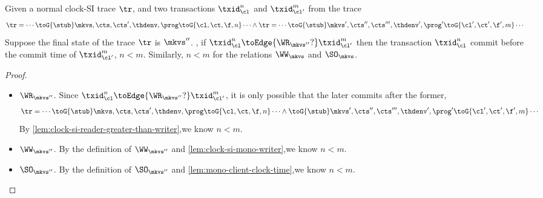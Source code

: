 \begin{lemma}
    \label{lem:clock-si-wr-ww-so}
    Given a normal clock-SI trace \( \tr \), and two transactions \( \txid_\cl^n \) and \( \txid_{\cl'}^m \) from the trace
    \[
        \begin{array}{@{}l@{}}
            \tr = \cdots \toG{\stub} \mkvs,\cts,\cts',\thdenv, \prog \toG{\cl,\ct,\f,n} \cdots \land 
            \tr = \cdots \toG{\stub} \mkvs',\cts'',\cts''',\thdenv', \prog' \toG{\cl',\ct',\f',m} \cdots
        \end{array}
    \]
    Suppose the final state of the trace \( \tr \) is \( \mkvs'' \).
    , if \( \txid_\cl^n \toEdge{\WR_{\mkvs''}?} \txid_{\cl'}^m \) then the transaction \( \txid_{\cl}^n \) commit before the commit time of \( \txid_{\cl'}^m \), \ie \( n < m \).
    Similarly, \( n <  m \) for the relations \( \WW_\mkvs \) and \( \SO_\mkvs \).
\end{lemma}
\begin{proof}
    \begin{itemize}
        \item \( \WR_{\mkvs''} \).
            Since  \( \txid_\cl^n \toEdge{\WR_{\mkvs''}?} \txid_{\cl'}^m \),
            it is only possible that the later commits after the former,
            \[
                \begin{array}{@{}l@{}}
                    \tr = \cdots \toG{\stub} \mkvs,\cts,\cts',\thdenv, \prog \toG{\cl,\ct,\f,n} \cdots \land
                    \toG{\stub} \mkvs',\cts'',\cts''',\thdenv', \prog' \toG{\cl',\ct',\f',m} \cdots
                \end{array}
            \]
            By \cref{lem:clock-si-reader-greater-than-writer},we know \( n < m \).
        \item \( \WW_{\mkvs''} \).
            By the definition of  \( \WW_{\mkvs''} \) and \cref{lem:clock-si-mono-writer},we know \( n < m \).
        \item \( \SO_{\mkvs''} \).
            By the definition of  \( \SO_{\mkvs''} \) and \cref{lem:mono-client-clock-time},we know \( n < m \).
    \end{itemize}
\end{proof}

